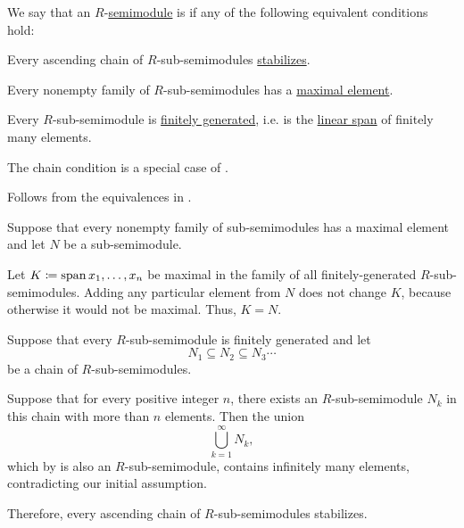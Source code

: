 \begin{definition}\label{def:noetherian_semimodule}
  We say that an \( R \)-\hyperref[def:semimodule]{semimodule} is  if any of the following equivalent conditions hold:
  \begin{thmenum}
     Every ascending chain of \( R \)-sub-semimodules \hyperref[def:stabilizing_chain]{stabilizes}.

     Every nonempty family of \( R \)-sub-semimodules has a \hyperref[def:extremal_points/maximal_and_minimal_element]{maximal element}.

     Every \( R \)-sub-semimodule is \hyperref[def:module_presentation]{finitely generated}, i.e. is the \hyperref[def:semimodule/submodel]{linear span} of finitely many elements.
  \end{thmenum}
\end{definition}
\begin{comments}
  \item The chain condition  is a special case of .
\end{comments}
\begin{defproof}
   Follows from the equivalences in .

   Suppose that every nonempty family of sub-semimodules has a maximal element and let \( N \) be a sub-semimodule.

  Let \( K \coloneqq \operatorname{span}{ x_1, \ldots, x_n } \) be maximal in the family of all finitely-generated \( R \)-sub-semimodules. Adding any particular element from \( N \) does not change \( K \), because otherwise it would not be maximal. Thus, \( K = N \).

   Suppose that every \( R \)-sub-semimodule is finitely generated and let
  \begin{equation*}
    N_1 \subseteq N_2 \subseteq N_3 \cdots
  \end{equation*}
  be a chain of \( R \)-sub-semimodules.

  Suppose that for every positive integer \( n \), there exists an \( R \)-sub-semimodule \( N_k \) in this chain with more than \( n \) elements. Then the union
  \begin{equation*}
    \bigcup_{k=1}^\infty N_k,
  \end{equation*}
  which by  is also an \( R \)-sub-semimodule, contains infinitely many elements, contradicting our initial assumption.

  Therefore, every ascending chain of \( R \)-sub-semimodules stabilizes.
\end{defproof}

